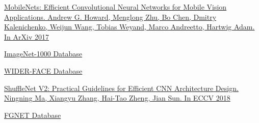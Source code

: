 \begin{thebibliography}{0}
    \hypertarget{mobile}{}
    \href{https://arxiv.org/abs/1704.04861}
    {
        MobileNets: Efficient Convolutional Neural Networks for Mobile Vision Applications.
        Andrew G. Howard, Menglong Zhu, Bo Chen, Dmitry Kalenichenko, Weijun Wang, Tobias Weyand, Marco Andreetto, Hartwig Adam.
        In ArXiv 2017
    }

    \hypertarget{imagenet}{}
    \href{http://www.image-net.org/}
    {
        ImageNet-1000 Database
    }

    \hypertarget{wider}{}
    \href{http://shuoyang1213.me/WIDERFACE/}
    {
        WIDER-FACE Database
    }

    \hypertarget{shuffle}{}
    \href{https://arxiv.org/abs/1807.11164}
    {
        ShuffleNet V2: Practical Guidelines for Efficient CNN Architecture Design.
        Ningning Ma, Xiangyu Zhang, Hai-Tao Zheng, Jian Sun.
        In ECCV 2018
    }

    \hypertarget{fgnet}{}
    \href{https://yanweifu.github.io/FG_NET_data/}
    {
        FGNET Database
    }

\end{thebibliography}